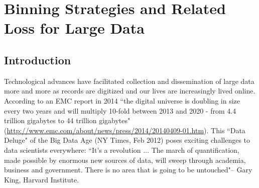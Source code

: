 \chapter{Binning Strategies and Related Loss for Large Data}
\label{BinnedScatter}

\newcommand{\ktm}[1]{{\color{red} #1}} %
\newcommand{\hh}[1]{{\color{blue} #1}} %


\begin{abstract}
Dealing with the data deluge of the Big Data Age is both exciting and challenging. The demands of large data require us to re-think strategies of visualizing data. Plots employing binning methods have been suggested in the past as viable alternative to standard plots based on raw data, as the resulting area plots tend to not be affected by increases in data as much. This comes with the price of loss of information inherent to any binning scheme. In this paper we discuss properties of two commonly used binning algorithms. We define loss of information in the specific setting of two dimensional displays, provide readily applicable tools for loss evaluation and discuss the two binning schemes with respect to their loss in the framework of a simulation and two case studies.
\end{abstract}


\section{Introduction}
\label{Intro}





Technological advances have facilitated collection and dissemination of large data more and more as records are digitized and our lives are increasingly lived online. According to an EMC report in 2014 ``the digital universe is doubling in size every two years and will multiply 10-fold between 2013 and 2020 - from 4.4 trillion gigabytes to 44 trillion gigabytes" (\url{http://www.emc.com/about/news/press/2014/20140409-01.htm}). This ``Data Deluge" of the Big Data Age (NY Times, Feb 2012) poses exciting challenges to data scientists everywhere: ``It's a revolution $\dots$ The march of quantification, made possible by enormous new sources of data, will sweep through academia, business and government. There is no area that is going to be untouched"-- Gary King, Harvard Institute.  
 
